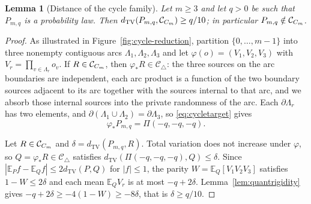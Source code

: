 \documentclass[11pt]{article}
\theoremstyle{plain}
\newtheorem{lemma}[theorem]{Lemma}
\theoremstyle{definition}
\DeclareMathOperator{\TV}{TV}
\newcommand{\Ctri}{\mathcal C_{\triangle}}
\newcommand{\E}{\mathbb E}
\begin{document}
\begin{lemma}[Distance of the cycle family]\label{lem:cycledistance}
Let $m\ge3$ and let $q>0$ be such that $P_{m,q}$ is a probability law. Then $d_{\TV}(P_{m,q},\Ccyc)\ge q/10$; in particular $P_{m,q}\notin\mathcal C_{C_m}$.
\end{lemma}

\begin{proof}
As illustrated in Figure~\ref{fig:cycle-reduction}, partition $\{0,\dots,m-1\}$ into three nonempty contiguous arcs $\Lambda_1,\Lambda_2,\Lambda_3$ and let $\varphi(o)=(V_1,V_2,V_3)$ with $V_r=\prod_{v\in\Lambda_r}o_v$. If $R\in\mathcal C_{C_m}$, then $\varphi_*R\in\Ctri$: the three sources on the arc boundaries are independent, each arc product is a function of the two boundary sources adjacent to its arc together with the sources internal to that arc, and we absorb those internal sources into the private randomness of the arc. Each $\partial\Lambda_r$ has two elements, and $\partial(\Lambda_1\cup\Lambda_2)=\partial\Lambda_3$, so \eqref{eq:cycletarget} gives
\[
\varphi_*P_{m,q}=\Pi(-q,-q,-q).
\]

Let $R\in\mathcal C_{C_m}$ and $\delta=d_{\TV}(P_{m,q},R)$. Total variation does not increase under $\varphi$, so $Q=\varphi_*R\in\Ctri$ satisfies $d_{\TV}(\Pi(-q,-q,-q),Q)\le\delta$. Since $|\E_Pf-\E_Qf|\le2d_{\TV}(P,Q)$ for $|f|\le1$, the parity $W=\E_Q[V_1V_2V_3]$ satisfies $1-W\le2\delta$ and each mean $\E_QV_r$ is at most $-q+2\delta$. Lemma~\ref{lem:quantrigidity} gives $-q+2\delta\ge-4(1-W)\ge-8\delta$, that is $\delta\ge q/10$.
\end{proof}
\end{document}
